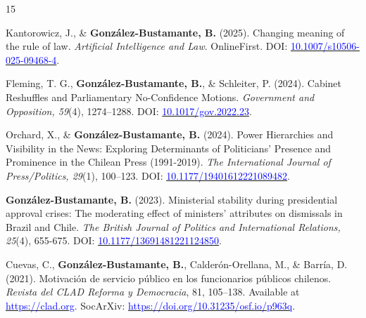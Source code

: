 \begin{publications}
\begin{benumerate}{15}
\item{Kantorowicz, J., \& {\bfseries González-Bustamante, B.} (2025). Changing meaning of the rule of law. {\itshape Artificial Intelligence and Law}. OnlineFirst. DOI: \href{https://doi.org/10.1007/s10506-025-09468-4}{\textcolor{blue}{10.1007/s10506-025-09468-4}}.}\vspace{1mm}

\item{Fleming, T. G., {\bfseries González-Bustamante, B.}, \& Schleiter, P. (2024). Cabinet Reshuffles and Parliamentary No-Confidence Motions. {\itshape Government and Opposition, 59}(4), 1274--1288. DOI: \href{https://doi.org/10.1017/gov.2022.23}{\textcolor{blue}{10.1017/gov.2022.23}}.}\vspace{1mm}

\item{Orchard, X., \& {\bfseries González-Bustamante, B.} (2024). Power Hierarchies and Visibility in the News: Exploring Determinants of Politicians’ Presence and Prominence in the Chilean Press (1991-2019). {\itshape The International Journal of Press/Politics, 29}(1), 100--123. DOI: \href{https://doi.org/10.1177/19401612221089482}{\textcolor{blue}{10.1177/19401612221089482}}.}\vspace{1mm}

\item{{\bfseries González-Bustamante, B.} (2023). Ministerial stability during presidential approval crises: The moderating effect of ministers’ attributes on dismissals in Brazil and Chile. {\itshape The British Journal of Politics and International Relations, 25}(4), 655-675. DOI: \href{https://doi.org/10.1177/13691481221124850}{\textcolor{blue}{10.1177/13691481221124850}}.}\vspace{1mm}


\item{Cuevas, C., {\bfseries González-Bustamante, B.}, Calderón-Orellana, M., \& Barría, D. (2021). Motivación de servicio público en los funcionarios públicos chilenos. {\itshape Revista del CLAD Reforma y Democracia}, 81, 105--138. Available at \href{https://revista.clad.org/ryd/en/issue/view/50}{\textcolor{blue}{https://clad.org}}. SocArXiv: \href{https://doi.org/10.31235/osf.io/p963q}{\textcolor{blue}{https://doi.org/10.31235/osf.io/p963q}}.}\vspace{1mm}


\end{benumerate}
\end{publications}
